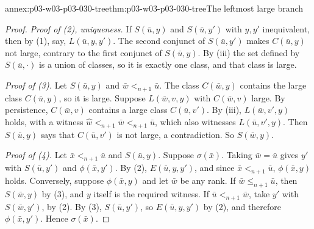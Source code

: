 \begin{annexitem}{annex:p03-w03-p03-030-tree}{thm:p03-w03-p03-030-tree}{The leftmost large branch}
\begin{proof}
\emph{Proof of (2), uniqueness.}  If \(S(\bar u,y)\) and \(S(\bar u,y')\) with
\(y,y'\) inequivalent, then by (1), say, \(L(\bar u,y,y')\).  The second
conjunct of \(S(\bar u,y')\) makes \(C(\bar u,y)\) not large, contrary to the
first conjunct of \(S(\bar u,y)\).  By (iii) the set defined by \(S(\bar
u,\cdot)\) is a union of classes, so it is exactly one class, and that class
is large.

\emph{Proof of (3).}  Let \(S(\bar u,y)\) and \(\bar w<_{n+1}\bar u\).  The
class \(C(\bar w,y)\) contains the large class \(C(\bar u,y)\), so it is
large.  Suppose \(L(\bar w,v,y)\) with \(C(\bar w,v)\) large.  By
persistence, \(C(\bar w,v)\) contains a large class \(C(\bar u,v')\).  By
(iii), \(L(\bar w,v',y)\) holds, with a witness \(\hat w<_{n+1}\bar w<_{n+1}\bar
u\), which also witnesses \(L(\bar u,v',y)\).  Then \(S(\bar u,y)\) says that
\(C(\bar u,v')\) is not large, a contradiction.  So \(S(\bar w,y)\).

\emph{Proof of (4).}  Let \(\bar x<_{n+1}\bar u\) and \(S(\bar u,y)\).
Suppose \(\sigma(\bar x)\).  Taking \(\bar w=\bar u\) gives \(y'\) with
\(S(\bar u,y')\) and \(\phi(\bar x,y')\).  By (2), \(E(\bar u,y,y')\), and since
\(\bar x<_{n+1}\bar u\), \(\phi(\bar x,y)\) holds.  Conversely, suppose
\(\phi(\bar x,y)\) and let \(\bar w\) be any rank.  If \(\bar w\le_{n+1}\bar u\),
then \(S(\bar w,y)\) by (3), and \(y\) itself is the required witness.  If
\(\bar u<_{n+1}\bar w\), take \(y'\) with \(S(\bar w,y')\), by (2).  By (3),
\(S(\bar u,y')\), so \(E(\bar u,y,y')\) by (2), and therefore \(\phi(\bar
x,y')\).  Hence \(\sigma(\bar x)\).
\end{proof}
\end{annexitem}

